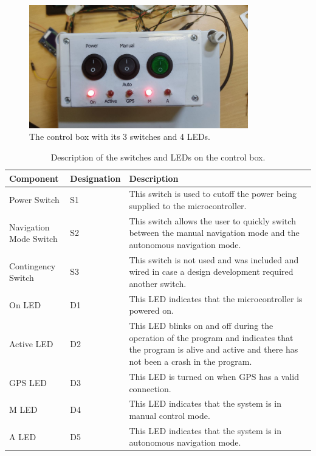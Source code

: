 	\begin{figure}[hb]
		\begin{center}
			\includegraphics[width = 0.85\textwidth]{figures/controlBox.jpg}
			\caption{The control box with its 3 switches and 4 LEDs.}
			\label{fig:3:controlBox}
		\end{center}
	\end{figure}
		\begin{table}[ht]
		\begin{center}
			\caption{Description of the switches and LEDs on the control box.}
			\label{tab:3:controlBx}
			\begin{tabular}{|p{0.2\linewidth} | p{0.15\linewidth}|p{0.65\linewidth}|}
				\hline
				Component & Designation & Description \\
				\hline
				Power Switch & S1 & This switch is used to cutoff the power being supplied to the microcontroller. \\
				\hline
				Navigation Mode Switch & S2 & This switch allows the user to quickly switch between the manual navigation mode and the autonomous navigation mode. \\
				\hline
				Contingency Switch & S3 & This switch is not used and was included and wired in case a design development required another switch. \\
				\hline
				On LED & D1 & This LED indicates that the microcontroller is powered on. \\
				\hline
				Active LED & D2 & This LED blinks on and off during the operation of the program and indicates that the program is alive and active and there has not been a crash in the program. \\
				\hline
				GPS LED & D3 & This LED is turned on when GPS has a valid connection. \\
				\hline 
				M LED & D4 & This LED indicates that the system is in manual control mode. \\
				\hline
				A LED & D5 &  This LED indicates that the system is in autonomous navigation mode. \\
				\hline
			\end{tabular}
		\end{center}
	\end{table}

